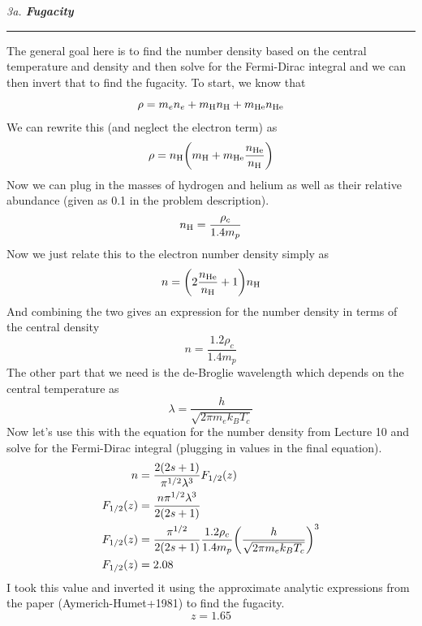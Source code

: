 \documentclass[12pt, letterpaper, twoside]{article}
\newcommand{\question}[1]{{\noindent \it #1}}
\newcommand{\answer}[1]{
    \par\noindent\rule{\textwidth}{0.4pt}#1\vspace{0.5cm}
}
\begin{document}
\question{3a. \textbf{Fugacity}}
\answer{
    The general goal here is to find the number density based on the central temperature and density and then solve for the Fermi-Dirac integral and we can then invert that to find the fugacity. To start, we know that
    \begin{equation}
        \rho = m_e n_e + m_{\rm H} n_{\rm H} + m_{\rm He} n_{\rm He}
    \end{equation}
    We can rewrite this (and neglect the electron term) as
    \begin{equation}
        \rho = n_{\rm H} \qty(m_{\rm H} + m_{\rm He} \frac{n_{\rm He}}{n_{\rm H}})
    \end{equation}
    Now we can plug in the masses of hydrogen and helium as well as their relative abundance (given as 0.1 in the problem description).
    \begin{equation}
        n_{\rm H} = \frac{\rho_c}{1.4 m_p}
    \end{equation}
    Now we just relate this to the electron number density simply as
    \begin{equation}
        n = \qty(2 \frac{n_{\rm He}}{n_{\rm H}} + 1) n_{\rm H}
    \end{equation}
    And combining the two gives an expression for the number density in terms of the central density
    \begin{equation}
        n = \frac{1.2 \rho_c}{1.4 m_p}
    \end{equation}
    The other part that we need is the de-Broglie wavelength which depends on the central temperature as
    \begin{equation}
        \lambda = \frac{h}{\sqrt{2 \pi m_e k_B T_c}}
    \end{equation}
    Now let's use this with the equation for the number density from Lecture 10 and solve for the Fermi-Dirac integral (plugging in values in the final equation).
    \begin{align}
        n &= \frac{2(2s + 1)}{\pi^{1/2} \lambda^3} F_{1/2}(z) \\
        F_{1/2}(z) &= \frac{n \pi^{1/2} \lambda^3}{2(2s + 1)} \\
        F_{1/2}(z) &= \frac{\pi^{1/2}}{2(2s + 1)} \frac{1.2 \rho_c}{1.4 m_p} \qty(\frac{h}{\sqrt{2 \pi m_e k_B T_c}})^3 \\
        F_{1/2}(z) &= 2.08
    \end{align}
    I took this value and inverted it using the approximate analytic expressions from the paper (Aymerich-Humet+1981) to find the fugacity.
    \begin{equation}
        \boxed{ z = 1.65 }
    \end{equation}
}
\end{document}

